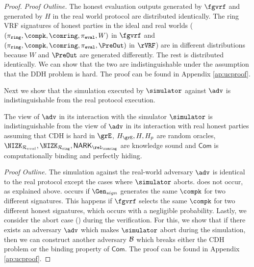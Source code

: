 \begin{proof}
	\noindent \textit{Proof Outline.} 	The honest evaluation outputs generated by $ \fgvrf $ and generated by $ H $ in the real world protocol are distributed identically. The ring VRF signatures of honest parties in the ideal and real worlds ($ (\piring, \allowbreak \compk, \allowbreak \comring, \pieval, W) $ in $ \fgvrf $ and $ (\piring, \compk, \comring, \pieval, \PreOut) $ in $ \rVRF $) are in different distributions because $ W $ and $ \PreOut $ are generated differently. The rest is distributed identically. We can show that the two are indistinguishable under the assumption that the DDH problem is hard. The proof can be found in Appendix \ref{ap:ucproof}.
	
	
	Next we show that the simulation executed by $ \simulator $ against $ \adv $ is indistinguishable from the real protocol execution.
	
	\begin{lemma} \label{lem:simulation-ind}
		The view of $ \adv $ in its interaction with the simulator $ \simulator $ is indistinguishable from the view of $ \adv $ in its interaction with real honest parties assuming that CDH is hard in $ \GG $, $\hashG, \hash, \hash_p $ are random oracles, $ \NIZK_{\rcom}, \NIZK_{\rsnark}, \NARK_{\relcomring} $ are knowledge sound and $ \mathsf{Com} $ is computationally binding and perfectly hiding. 
	\end{lemma}

	\textit{Proof Outline.} The  simulation against the real-world adversary $ \adv $ is identical to the real protocol except the cases where $ \simulator $ aborts.  does not occur, as explained above.   occurs if $ \Gen_{sign} $ generates the same $ \compk $ for two different signatures. This happens if $ \fgvrf $  selects the same $ \compk $ for two different honest signatures, which occurs with a negligible probability.
	Lastly, we consider the abort case () during the verification.
	For this, we show that if there exists an adversary $ \adv $ which makes $ \simulator $ abort during the simulation, then we can construct another adversary $ \mathcal{B} $ which breaks either the CDH problem or the binding property of $ \mathsf{Com}$. The proof can be found in Appendix \ref{ap:ucproof}.
	
	
\end{proof}

